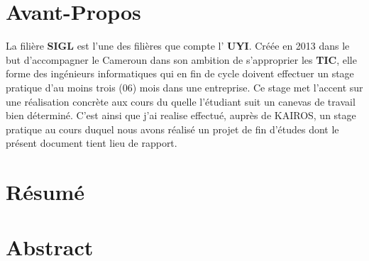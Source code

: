 \documentclass[12pt,a4paper,oneside]{extbook}
\begin{document}
\newpage
\section*{Avant-Propos}
La filière  \textbf{SIGL} est l'une des filières que compte l' \textbf{UYI}. Créée en 2013 dans le but d'accompagner le Cameroun dans son ambition de s'approprier les  \textbf{TIC}, elle forme des ingénieurs  informatiques qui en fin de cycle doivent effectuer un stage pratique d'au moins trois (06) mois dans une entreprise. Ce stage met l'accent sur une réalisation concrète aux cours du quelle l'étudiant suit un canevas de travail bien déterminé. C'est ainsi que j'ai realise  effectué, auprès de KAIROS, un stage pratique au cours duquel nous avons réalisé un projet de fin d'études dont le présent document tient lieu de rapport.


\newpage
\section*{Résumé}




\textbf %
\newpage
\section*{Abstract}









% 
% 
\end{document}
